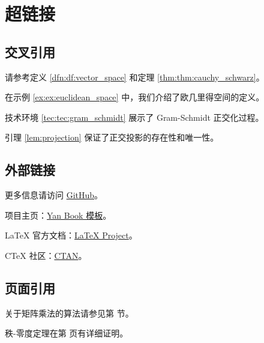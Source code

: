 \section{超链接}

\subsection{交叉引用}

请参考定义 \ref{dfn:df:vector_space} 和定理 \ref{thm:thm:cauchy_schwarz}。

在示例 \ref{ex:ex:euclidean_space} 中，我们介绍了欧几里得空间的定义。

技术环境 \ref{tec:tec:gram_schmidt} 展示了 Gram-Schmidt 正交化过程。

引理 \ref{lem:projection} 保证了正交投影的存在性和唯一性。

\subsection{外部链接}

更多信息请访问 \href{https://github.com}{GitHub}。

项目主页：\href{https://github.com/example/yanbook}{Yan Book 模板}。

LaTeX 官方文档：\href{https://www.latex-project.org}{LaTeX Project}。

CTeX 社区：\href{https://www.ctan.org}{CTAN}。

\subsection{页面引用}

关于矩阵乘法的算法请参见第 \pageref{sec:algobox} 节。

秩-零度定理在第 \pageref{thm:rank_nullity} 页有详细证明。